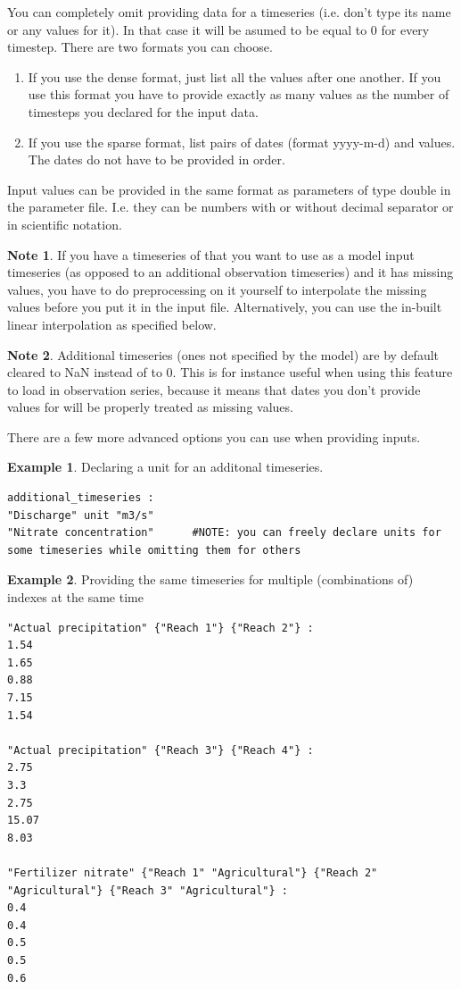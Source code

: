 \documentclass[11pt]{article}
\theoremstyle{definition}
\newtheorem{mynote}{Note}
\newenvironment{note}%
  {\begin{lrbox}{\notebox}%
   \begin{minipage}{\dimexpr\linewidth-2\fboxsep}
   \begin{mynote}}%
  {\end{mynote}%
   \end{minipage}%
   \end{lrbox}%
   \begin{trivlist}
     \item[]\colorbox{silver}{\usebox\notebox}
   \end{trivlist}}
\newtheorem{myexample}{Example}
\newenvironment{example}%
  {\begin{lrbox}{\examplebox}%
   \begin{minipage}{\dimexpr\linewidth-2\fboxsep}
   \begin{myexample}}%
  {\end{myexample}%
   \end{minipage}%
   \end{lrbox}%
   \begin{trivlist}
     \item[]\colorbox{silver}{\usebox\examplebox}
   \end{trivlist}}
\begin{document}
You can completely omit providing data for a timeseries (i.e. don't type its name or any values for it). In that case it will be asumed to be equal to 0 for every timestep. There are two formats you can choose.
\begin{enumerate}[i]
\item If you use the dense format, just list all the values after one another. If you use this format you have to provide exactly as many values as the number of timesteps you declared for the input data.
\item If you use the sparse format, list pairs of dates (format yyyy-m-d) and values. The dates do not have to be provided in order.
\end{enumerate}
Input values can be provided in the same format as parameters of type double in the parameter file. I.e. they can be numbers with or without decimal separator or in scientific notation.

\begin{note}
If you have a timeseries of that you want to use as a model input timeseries (as opposed to an additional observation timeseries) and it has missing values, you have to do preprocessing on it yourself to interpolate the missing values before you put it in the input file. Alternatively, you can use the in-built linear interpolation as specified below.
\end{note}

\begin{note}
Additional timeseries (ones not specified by the model) are by default cleared to NaN instead of to 0. This is for instance useful when using this feature to load in observation series, because it means that dates you don't provide values for will be properly treated as missing values.
\end{note}

There are a few more advanced options you can use when providing inputs.

\begin{example}\label{ex:declarewithunit}
Declaring a unit for an additonal timeseries.
\begin{lstlisting}
additional_timeseries :
"Discharge" unit "m3/s"
"Nitrate concentration"      #NOTE: you can freely declare units for some timeseries while omitting them for others
\end{lstlisting}
\end{example}

\begin{example}\label{ex:multiseries}
Providing the same timeseries for multiple (combinations of) indexes at the same time
\begin{lstlisting}
"Actual precipitation" {"Reach 1"} {"Reach 2"} :
1.54
1.65
0.88
7.15
1.54

"Actual precipitation" {"Reach 3"} {"Reach 4"} :
2.75
3.3
2.75
15.07
8.03

"Fertilizer nitrate" {"Reach 1" "Agricultural"} {"Reach 2" "Agricultural"} {"Reach 3" "Agricultural"} :
0.4
0.4
0.5
0.5
0.6
\end{lstlisting}
\end{example}
\end{document}
